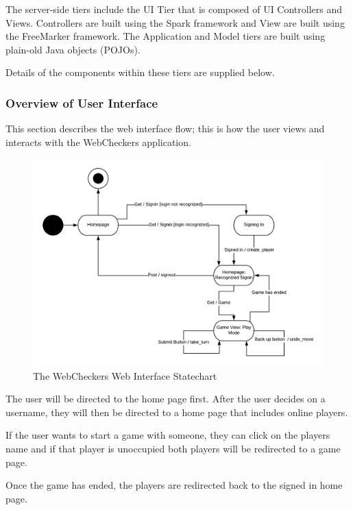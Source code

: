 \documentclass[]{article}
\begin{document}
The server-side tiers include the UI Tier that is composed of UI
Controllers and Views. Controllers are built using the Spark framework
and View are built using the FreeMarker framework. The Application and
Model tiers are built using plain-old Java objects (POJOs).

Details of the components within these tiers are supplied below.

\hypertarget{overview-of-user-interface}{%
\subsubsection{Overview of User
Interface}\label{overview-of-user-interface}}

This section describes the web interface flow; this is how the user
views and interacts with the WebCheckers application.

\begin{figure}
\centering
\includegraphics{./tex2pdf.1500/872966d688239a7cc0d12d004f77acfd8041a25f.png}
\caption{The WebCheckers Web Interface Statechart}
\end{figure}

The user will be directed to the home page first. After the user decides
on a username, they will then be directed to a home page that includes
online players.

If the user wants to start a game with someone, they can click on the
players name and if that player is unoccupied both players will be
redirected to a game page.

Once the game has ended, the players are redirected back to the signed
in home page.
\end{document}
